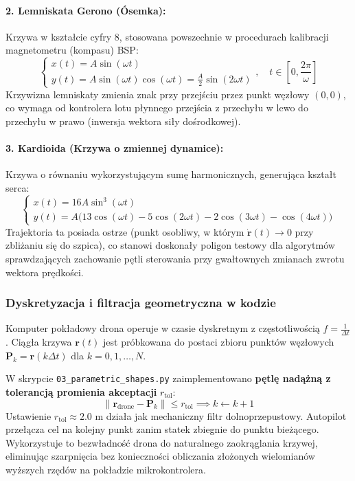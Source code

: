 \paragraph{2. Lemniskata Gerono (Ósemka):}
Krzywa w kształcie cyfry 8, stosowana powszechnie w procedurach kalibracji magnetometru (kompasu) BSP:
\begin{equation}
    \begin{cases}
        x(t) = A \sin(\omega t) \\
        y(t) = A \sin(\omega t)\cos(\omega t) = \frac{A}{2} \sin(2\omega t)
    \end{cases}, \quad t \in \left[0, \frac{2\pi}{\omega}\right]
\end{equation}
Krzywizna lemniskaty zmienia znak przy przejściu przez punkt węzłowy $(0,0)$, co wymaga od kontrolera lotu płynnego przejścia z przechyłu w lewo do przechyłu w prawo (inwersja wektora siły dośrodkowej).

\paragraph{3. Kardioida (Krzywa o zmiennej dynamice):}
Krzywa o równaniu wykorzystującym sumę harmonicznych, generująca kształt serca:
\begin{equation}
    \begin{cases}
        x(t) = 16A \sin^3(\omega t) \\
        y(t) = A \big(13\cos(\omega t) - 5\cos(2\omega t) - 2\cos(3\omega t) - \cos(4\omega t)\big)
    \end{cases}
\end{equation}
Trajektoria ta posiada ostrze (punkt osobliwy, w którym $\mathbf{\dot{r}}(t) \to 0$ przy zbliżaniu się do szpica), co stanowi doskonały poligon testowy dla algorytmów sprawdzających zachowanie pętli sterowania przy gwałtownych zmianach zwrotu wektora prędkości.

\subsubsection{Dyskretyzacja i filtracja geometryczna w kodzie}
Komputer pokładowy drona operuje w czasie dyskretnym z częstotliwością $f = \frac{1}{\Delta t}$. Ciągła krzywa $\mathbf{r}(t)$ jest próbkowana do postaci zbioru punktów węzłowych $\mathbf{P}_k = \mathbf{r}(k \Delta t)$ dla $k = 0, 1, \dots, N$. 

W skrypcie \texttt{03\_parametric\_shapes.py} zaimplementowano \textbf{pętlę nadążną z tolerancją promienia akceptacji} $r_{\text{tol}}$:
\begin{equation}
    \|\mathbf{r}_{\text{drone}} - \mathbf{P}_k\| \le r_{\text{tol}} \implies k \leftarrow k + 1
\end{equation}
Ustawienie $r_{\text{tol}} \approx 2.0\text{ m}$ działa jak mechaniczny filtr dolnoprzepustowy. Autopilot przełącza cel na kolejny punkt zanim statek zbiegnie do punktu bieżącego. Wykorzystuje to bezwładność drona do naturalnego zaokrąglania krzywej, eliminując szarpnięcia bez konieczności obliczania złożonych wielomianów wyższych rzędów na pokładzie mikrokontrolera.

